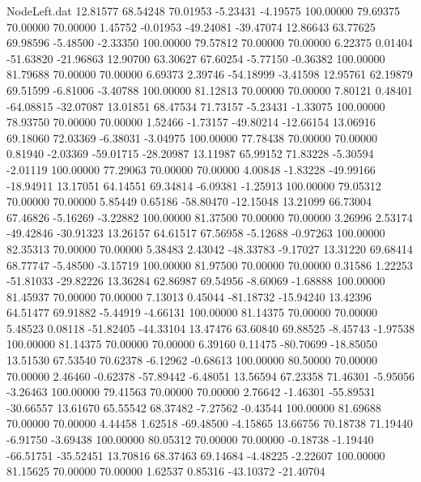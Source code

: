 \begin{filecontents}{NodeLeft.dat}
  12.81577   68.54248   70.01953    -5.23431   -4.19575  100.00000   79.69375   70.00000   70.00000    1.45752   -0.01953  -49.24081  -39.47074
  12.86643   63.77625   69.98596    -5.48500   -2.33350  100.00000   79.57812   70.00000   70.00000    6.22375    0.01404  -51.63820  -21.96863
  12.90700   63.30627   67.60254    -5.77150   -0.36382  100.00000   81.79688   70.00000   70.00000    6.69373    2.39746  -54.18999   -3.41598
  12.95761   62.19879   69.51599    -6.81006   -3.40788  100.00000   81.12813   70.00000   70.00000    7.80121    0.48401  -64.08815  -32.07087
  13.01851   68.47534   71.73157    -5.23431   -1.33075  100.00000   78.93750   70.00000   70.00000    1.52466   -1.73157  -49.80214  -12.66154
  13.06916   69.18060   72.03369    -6.38031   -3.04975  100.00000   77.78438   70.00000   70.00000    0.81940   -2.03369  -59.01715  -28.20987
  13.11987   65.99152   71.83228    -5.30594   -2.01119  100.00000   77.29063   70.00000   70.00000    4.00848   -1.83228  -49.99166  -18.94911
  13.17051   64.14551   69.34814    -6.09381   -1.25913  100.00000   79.05312   70.00000   70.00000    5.85449    0.65186  -58.80470  -12.15048
  13.21099   66.73004   67.46826    -5.16269   -3.22882  100.00000   81.37500   70.00000   70.00000    3.26996    2.53174  -49.42846  -30.91323
  13.26157   64.61517   67.56958    -5.12688   -0.97263  100.00000   82.35313   70.00000   70.00000    5.38483    2.43042  -48.33783   -9.17027
  13.31220   69.68414   68.77747    -5.48500   -3.15719  100.00000   81.97500   70.00000   70.00000    0.31586    1.22253  -51.81033  -29.82226
  13.36284   62.86987   69.54956    -8.60069   -1.68888  100.00000   81.45937   70.00000   70.00000    7.13013    0.45044  -81.18732  -15.94240
  13.42396   64.51477   69.91882    -5.44919   -4.66131  100.00000   81.14375   70.00000   70.00000    5.48523    0.08118  -51.82405  -44.33104
  13.47476   63.60840   69.88525    -8.45743   -1.97538  100.00000   81.14375   70.00000   70.00000    6.39160    0.11475  -80.70699  -18.85050
  13.51530   67.53540   70.62378    -6.12962   -0.68613  100.00000   80.50000   70.00000   70.00000    2.46460   -0.62378  -57.89442   -6.48051
  13.56594   67.23358   71.46301    -5.95056   -3.26463  100.00000   79.41563   70.00000   70.00000    2.76642   -1.46301  -55.89531  -30.66557
  13.61670   65.55542   68.37482    -7.27562   -0.43544  100.00000   81.69688   70.00000   70.00000    4.44458    1.62518  -69.48500   -4.15865
  13.66756   70.18738   71.19440    -6.91750   -3.69438  100.00000   80.05312   70.00000   70.00000   -0.18738   -1.19440  -66.51751  -35.52451
  13.70816   68.37463   69.14684    -4.48225   -2.22607  100.00000   81.15625   70.00000   70.00000    1.62537    0.85316  -43.10372  -21.40704

\end{filecontents}
